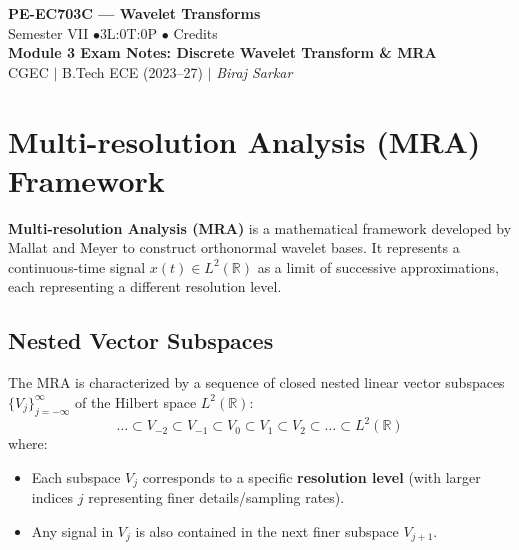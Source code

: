 \documentclass[12pt,a4paper]{article}
\begin{document}

\begin{center}
  {\LARGE\bfseries\color{myred} PE-EC703C --- Wavelet Transforms}\\[5pt]
  {\normalsize\color{mydark} Semester VII \quad$\bullet$\quad 3L:0T:0P \quad$\bullet$ Credits}\\[3pt]
  {\normalsize\color{myteal}\textbf{Module 3 Exam Notes: Discrete Wavelet Transform \& MRA}}\\[3pt]
  {\small\color{mydark} CGEC \;$|$\; B.Tech ECE (2023--27) \;$|$\; \textit{Biraj Sarkar}}
\end{center}
\vspace{2pt}
\noindent{\color{myred}\rule{\linewidth}{1.5pt}}
\vspace{2pt}

\hypersetup{linkcolor=mydark}
\tableofcontents
\hypersetup{linkcolor=myteal}
\newpage

\section{Multi-resolution Analysis (MRA) Framework}

\begin{tcolorbox}[defbox, title={\textbf{Definition of Multi-resolution Analysis}}]
\textbf{Multi-resolution Analysis (MRA)} is a mathematical framework developed by Mallat and Meyer to construct orthonormal wavelet bases. It represents a continuous-time signal $x(t) \in L^2(\mathbb{R})$ as a limit of successive approximations, each representing a different resolution level.
\end{tcolorbox}

\subsection{Nested Vector Subspaces}
The MRA is characterized by a sequence of closed nested linear vector subspaces $\{V_j\}_{j=-\infty}^{\infty}$ of the Hilbert space $L^2(\mathbb{R})$:
$$\dots \subset V_{-2} \subset V_{-1} \subset V_0 \subset V_1 \subset V_2 \subset \dots \subset L^2(\mathbb{R})$$
where:
\begin{itemize}[leftmargin=*, itemsep=3.5pt]
  \item Each subspace $V_j$ corresponds to a specific \textbf{resolution level} (with larger indices $j$ representing finer details/sampling rates).
  \item Any signal in $V_j$ is also contained in the next finer subspace $V_{j+1}$.
\end{itemize}
\end{document}
